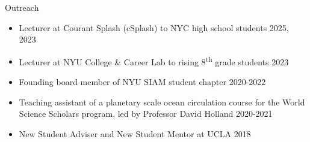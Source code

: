 \documentclass{resume} %
\begin{document}
\begin{rSection}{Outreach}
\begin{itemize}
    \itemsep -0.3em
    \item Lecturer at Courant Splash (cSplash) to NYC high school students \hfill 2025, 2023
    \item Lecturer at NYU College \& Career Lab to rising 8\textsuperscript{th} grade students \hfill 2023
    \item Founding board member of NYU SIAM student chapter \hfill 2020-2022
    \item Teaching assistant of a planetary scale ocean circulation course for the World Science Scholars program, led by Professor David Holland \hfill 2020-2021
    \item New Student Adviser and New Student Mentor at UCLA \hfill 2018
\end{itemize}
\end{rSection}



\end{document}
